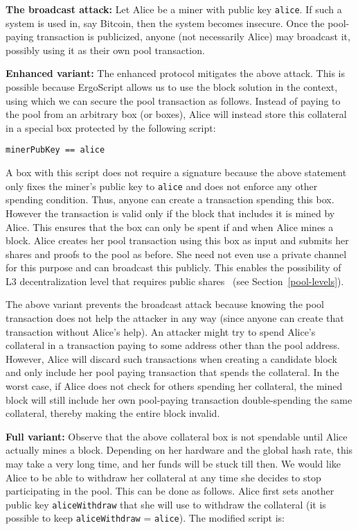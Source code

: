 \documentclass{llncs}
\newcommand{\langname}{ErgoScript\xspace}
\begin{document}
\textbf{The broadcast attack:} Let Alice be a miner with public key \texttt{alice}. If such a system is used in, say Bitcoin, then the system becomes insecure. Once the pool-paying transaction is publicized, anyone (not necessarily Alice) may broadcast it, possibly using it as their own pool transaction.

\textbf{Enhanced variant:} The enhanced protocol mitigates the above attack. This is possible because \langname allows us to use the block solution in the context, using which we can secure the pool transaction as follows. Instead of paying to the pool from an arbitrary box (or boxes), Alice will instead store this collateral in a special box protected by the following script:
\begin{verbatim}
minerPubKey == alice
\end{verbatim}

A box with this script does not require a signature because the above statement only fixes the miner's public key to \texttt{alice} and does not enforce any other spending condition. Thus, anyone can create a transaction spending this box. However the transaction is valid only if the block that includes it is mined by Alice. 
This ensures that the box can only be spent if and when Alice mines a block.  
Alice creates her pool transaction using this box as input and submits her shares and proofs to the pool as before. She need not even use a private channel for this purpose and can broadcast this publicly. This enables the possibility of L3 decentralization level that requires public shares~\cite{chesterman2018p2pool,luu2017smartpool} (see Section~\ref{pool-levels}).

The above variant prevents the broadcast attack because knowing the pool transaction does not help the attacker in any way (since anyone can create that transaction without Alice's help). An attacker might try to spend Alice's collateral in a transaction paying to some address other than the pool address. However, Alice will discard such transactions when creating a candidate block and only include her pool paying transaction that spends the collateral. In the worst case, if Alice does not check for others spending her collateral, the mined block will still include her own pool-paying transaction double-spending the same collateral, thereby making the entire block invalid. 

\textbf{Full variant:} Observe that the above collateral box is not spendable until Alice actually mines a block. Depending on her hardware and the global hash rate, this may take a very long time, and her funds will be stuck till then. We would like Alice to be able to withdraw her collateral at any time she decides to stop participating in the pool. This can be done as follows. Alice first sets another public key \texttt{aliceWithdraw} that she will use to withdraw the collateral (it is possible to keep \texttt{aliceWithdraw} = \texttt{alice}). The modified script is:
\end{document}
